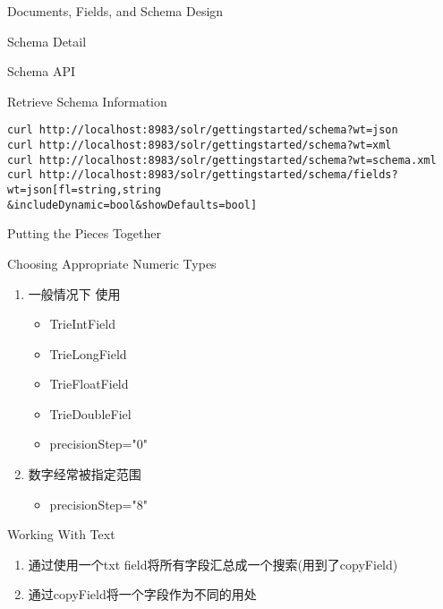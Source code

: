 \documentclass[presentation]{beamer}
\begin{document}
\begin{frame}[fragile,label={sec:orgc0e77e6}]{Documents, Fields, and Schema Design}
\begin{block}{Schema Detail}
\begin{block}{Schema API}
\begin{block}{Retrieve Schema Information}
\begin{verbatim}
curl http://localhost:8983/solr/gettingstarted/schema?wt=json
curl http://localhost:8983/solr/gettingstarted/schema?wt=xml
curl http://localhost:8983/solr/gettingstarted/schema?wt=schema.xml
curl http://localhost:8983/solr/gettingstarted/schema/fields?wt=json[fl=string,string
&includeDynamic=bool&showDefaults=bool]
\end{verbatim}
\end{block}
\end{block}


\begin{block}{Putting the Pieces Together}
\begin{block}{Choosing Appropriate Numeric Types}
\begin{enumerate}
\item 一般情况下 使用
\begin{itemize}
\item TrieIntField
\item TrieLongField
\item TrieFloatField
\item TrieDoubleFiel
\item precisionStep="0"
\end{itemize}
\item 数字经常被指定范围
\begin{itemize}
\item precisionStep="8"
\end{itemize}
\end{enumerate}
\end{block}


\begin{block}{Working With Text}
\begin{enumerate}
\item 通过使用一个txt field将所有字段汇总成一个搜索(用到了copyField)
\item 通过copyField将一个字段作为不同的用处
\end{enumerate}
\end{block}



\end{block}
\end{block}
\end{frame}
\end{document}
